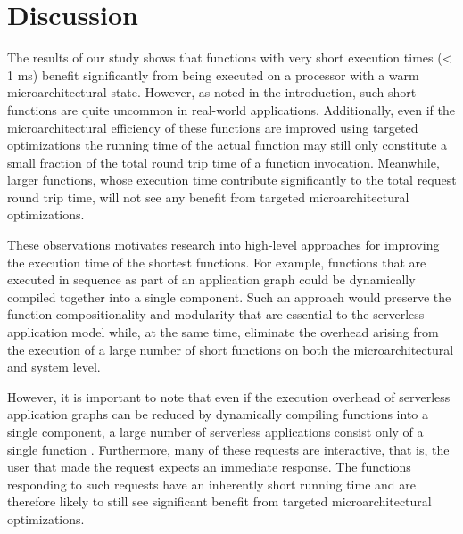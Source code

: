 \section{Discussion}
\label{wosc:sec:discussion}


The results of our study shows that functions with very short execution times (< 1 ms) benefit significantly from being executed on a processor with a warm microarchitectural state. However, as noted in the introduction, such short functions are quite uncommon in real-world applications. Additionally, even if the microarchitectural efficiency of these functions are improved using targeted optimizations the running time of the actual function may still only constitute a small fraction of the total round trip time of a function invocation. Meanwhile, larger functions, whose execution time contribute significantly to the total request round trip time, will not see any benefit from targeted microarchitectural optimizations.

These observations motivates research into high-level approaches for improving the execution time of the shortest functions. For example, functions that are executed in sequence as part of an application graph could be dynamically compiled together into a single component. Such an approach would preserve the function compositionality and modularity that are essential to the serverless application model while, at the same time, eliminate the overhead arising from the execution of a large number of short functions on both the microarchitectural and system level.

However, it is important to note that even if the execution overhead of serverless application graphs can be reduced by dynamically compiling functions into a single component, a large number of serverless applications consist only of a single function \cite{serverless_state}. Furthermore, many of these requests are interactive, that is, the user that made the request expects an immediate response. The functions responding to such requests have an inherently short running time and are therefore likely to still see significant benefit from targeted microarchitectural optimizations.


